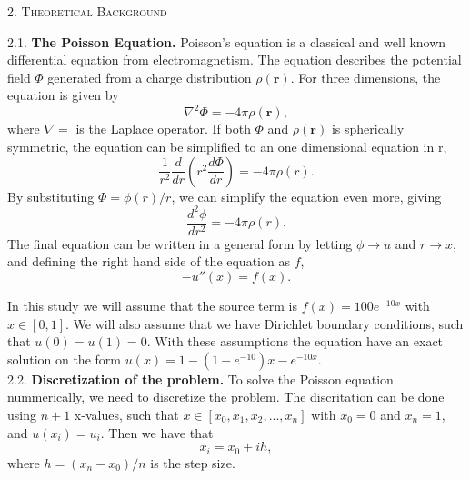 \documentclass[a4paper,10pt]{article}
\newcommand{\der}[2]{\frac{d #1}{d #2}}
\newcommand{\dder}[2]{\frac{d^2 #1}{d #2 ^2}}
\begin{document}
\newpage


\begin{center}
\textsc{2. Theoretical Background}
\end{center}
2.1. \textbf{The Poisson Equation.} 
Poisson's equation is a classical and well known differential equation from electromagnetism. The equation describes the potential field $\Phi$ generated from a charge distribution $\rho(\textbf{r})$. For three dimensions, the equation is given by
 $$ \nabla^2 \Phi = -4 \pi \rho(\textbf{r}), $$
where $\nabla = $ is the Laplace operator. If both $\Phi$ and $\rho(\textbf{r})$ is spherically symmetric, the equation can be simplified to an one dimensional equation in r,
$$ \frac{1}{r^2}  \der{}{r} \left( r^2 \der{\Phi}{r} \right)= -4 \pi \rho(r).$$
By substituting $\Phi = \phi(r)/r$, we can simplify the equation even more, giving 
$$ \dder{\phi}{r} = -4\pi \rho(r). $$ 
The final equation can be written in a general form by letting $\phi \rightarrow u$ and $r \rightarrow x$, and defining the right hand side of the equation as $f$,
$$- u''(x) = f(x). $$ 

In this study we will assume that the source term is $f(x) = 100 e^{-10x}$ with $x \in [0,1]$. We will also assume that we have Dirichlet boundary conditions, such that $ u(0) = u(1) = 0. $ With these assumptions the equation have an exact solution on the form $u(x) = 1 - (1 - e^{-10})x - e^{-10x}$. \\



2.2. \textbf{Discretization of the problem.} 
To solve the Poisson equation nummerically, we need to discretize the problem. The discritation can be done using $n+1$ x-values, such that $x \in [x_0, x_1, x_2, ..., x_n]$ with $x_0 = 0$ and $x_n = 1$, and $u(x_i) = u_i$. Then we have that 
$$ x_i = x_0 + ih, $$
where $h = (x_n - x_0)/n$ is the step size. \\
\end{document}
